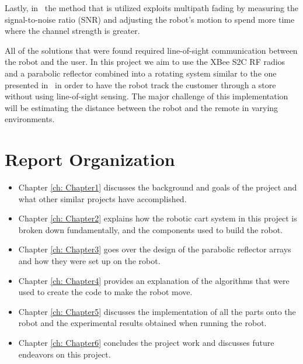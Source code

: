\vspace*{12pt}
\noindent
Lastly, in~\cite{Lindhe2009} the method that is utilized exploits multipath fading by measuring the signal-to-noise ratio (SNR) and adjusting the robot's motion to spend more time where the channel strength is greater.

\vspace*{12pt}
\noindent
All of the solutions that were found required line-of-sight communication between the robot and the user. In this project we aim to use the XBee S2C RF radios and a parabolic reflector combined into a rotating system similar to the one presented in~\cite{Miah2018-Intelligent} in order to have the robot track the customer through a store without using line-of-sight sensing. The major challenge of this implementation will be estimating the distance between the robot and the remote in varying environments.

\section{Report Organization}
\begin{itemize}
    \item Chapter \ref{ch: Chapter1} discusses the background and goals of the project and what other similar projects have accomplished.
    \item Chapter \ref{ch: Chapter2} explains how the robotic cart system in this project is broken down fundamentally, and the components used to build the robot.
    \item Chapter \ref{ch: Chapter3} goes over the design of the parabolic reflector arrays and how they were set up on the robot.
    \item Chapter \ref{ch: Chapter4} provides an explanation of the algorithms that were used to create the code to make the robot move.
    \item Chapter \ref{ch: Chapter5} discusses the implementation of all the parts onto the robot and the experimental results obtained when running the robot.
    \item Chapter \ref{ch: Chapter6} concludes the project work and discusses future endeavors on this project.
\end{itemize}

